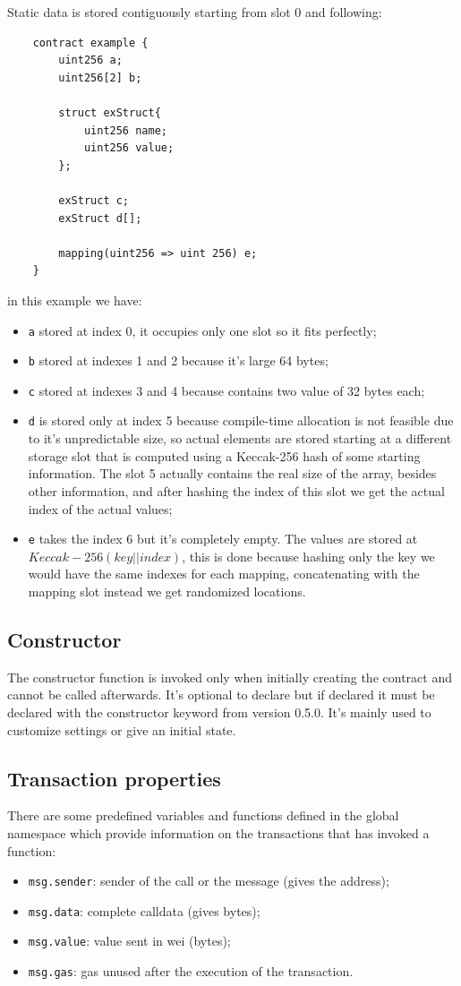 Static data is stored contiguously starting from slot 0 and following:
\begin{verbatim}
    contract example {
        uint256 a;
        uint256[2] b;

        struct exStruct{
            uint256 name;
            uint256 value;
        };

        exStruct c;
        exStruct d[];

        mapping(uint256 => uint 256) e;
    }
\end{verbatim}
in this example we have:
\begin{itemize}
    \item \verb|a| stored at index 0, it occupies only one slot so it fits perfectly;
    \item \verb|b| stored at indexes 1 and 2 because it's large 64 bytes;
    \item \verb|c| stored at indexes 3 and 4 because contains two value of 32 bytes each;
    \item \verb|d| is stored only at index 5 because compile-time allocation is not feasible due to it's unpredictable size, so actual elements are stored starting at a different storage slot that is computed using a Keccak-256 hash of some starting information.
    The slot 5 actually contains the real size of the array, besides other information, and after hashing the index of this slot we get the actual index of the actual values;
    \item \verb|e| takes the index 6 but it's completely empty.
    The values are stored at $Keccak-256(key || index)$, this is done because hashing only the key we would have the same indexes for each mapping, concatenating with the mapping slot instead we get randomized locations.
\end{itemize}

\subsection{Constructor}
The constructor function is invoked only when initially creating the contract and cannot be called afterwards.
It's optional to declare but if declared it must be declared with the constructor keyword from version 0.5.0.
It's mainly used to customize settings or give an initial state.

\subsection{Transaction properties}
There are some predefined variables and functions defined in the global namespace which provide information on the transactions that has invoked a function:
\begin{itemize}
    \item \verb|msg.sender|: sender of the call or the message (gives the address);
    \item \verb|msg.data|: complete calldata (gives bytes);
    \item \verb|msg.value|: value sent in wei (bytes);
    \item \verb|msg.gas|: gas unused after the execution of the transaction.
\end{itemize}

